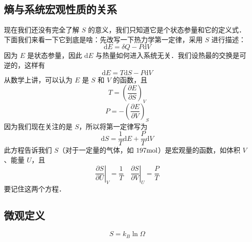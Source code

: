 \subsection{熵与系统宏观性质的关系}
现在我们还没有完全了解 $S$ 的意义，我们只知道它是个状态参量和它的定义式．下面我们来看一下它到底是啥：先改写一下热力学第一定律，采用 $S$ 进行描述：
\begin{equation}
\mathrm d E = \delta{Q} - P\mathrm d V
\end{equation}
因为 $E$ 是状态参量，因此 $\mathrm d E$ 与热量如何进入系统无关．我们设热最的交换是可逆的，这样有
\begin{equation}
\mathrm d E =T\mathrm dS - P\mathrm d V
\end{equation}
从数学上讲，可以认为 $E$ 是 $S $ 和 $V $ 的函数，且
\begin{equation}
T=\left(\frac{\partial E}{\partial S}\right)_V
\end{equation}
\begin{equation}
P=-\left(\frac{\partial E}{\partial V}\right)_S
\end{equation}
因为我们现在关注的是 $S$，所以将第一定律写为
\begin{equation}
\text{d}S=\frac{1}{T}\text{d}E+\frac{P}{T}\text{d}V
\end{equation}
此方程告诉我们 $S$（对于一定量的气体，如 $197 \rm mol$）是宏观量的函数，如体积 $V $、能量 $U$，且
\begin{equation}
\left. \frac{\partial S}{\partial U} \right|_V=\frac{1}{T}\quad \left. \frac{\partial S}{\partial V} \right|_U=\frac{P}{T}
\end{equation}
要记住这两个方程．


\subsection{微观定义} 
\begin{equation}
S = k_B \ln \Omega
\end{equation}

 

